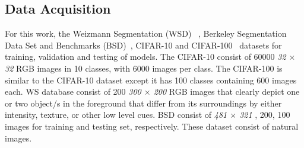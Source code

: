 \documentclass{WitsPhysicsReport}
\begin{document}
\subsection{Data Acquisition}
\label{sec:Datasets}
For this work, the Weizmann Segmentation (WSD)~\cite{AlpertGBB07} , Berkeley Segmentation Data Set and Benchmarks (BSD)~\cite{amfm_pami2011}, CIFAR-10 and CIFAR-100~\cite{krizhevsky2009learning} datasets for training, validation and testing of models. The CIFAR-10 consist of 60000 \textit{32 $\times$ 32} RGB images in 10 classes, with 6000 images per class. The CIFAR-100 is similar to the CIFAR-10 dataset except it has 100 classes containing 600 images each.  WS database consist of 200 \textit{300 $\times$ 200} RGB images that clearly depict one or two object/s in the foreground that differ from its surroundings by either intensity, texture, or other low level cues.  BSD consist of \textit{481 $\times$ 321} , 200, 100 images for training and testing set, respectively. These dataset consist of natural images.

\end{document}
